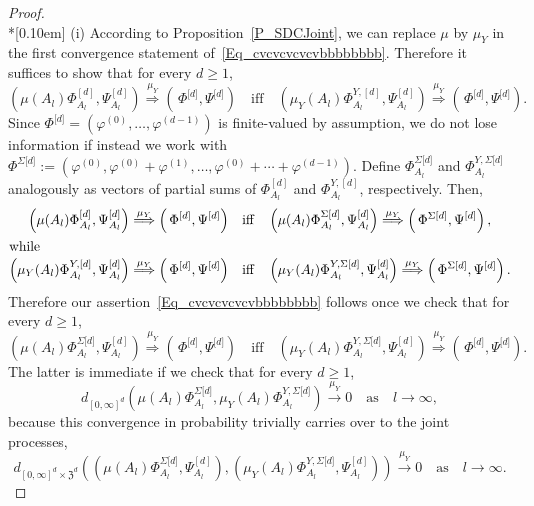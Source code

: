 \documentclass[10pt]{amsart}
\theoremstyle{definition}\newtheorem{defi}[theo]{Definition}\newtheorem{rema}[theo]{Remark}\newtheorem{exam}[theo]{Example}\newtheorem{exem}[theo]{Example}\newtheorem{nota}[theo]{Notation}
\newcommand{\frkZ}{\mathfrak{Z}}
\begin{document}
\begin{proof}\ \\*[0.10em]
\noindent(i) According to Proposition~\ref{P_SDCJoint}, we can replace $\mu$ by $\mu_{Y}$ in the first convergence statement of~\eqref{Eq_cvcvcvcvcvbbbbbbbb}. Therefore it suffices to show that for every $d\geq1$,
\[
\left(\mu(A_{l})\Phi_{A_{l}}^{[d]},\Psi_{A_{l}}^{[d]}\right)\overset{\mu_{Y} }{\Longrightarrow}\left(\,\Phi^{\lbrack d]},\Psi^{\lbrack d]}\right)\quad\text{iff}\quad \left(\mu_{Y}(A_{l})\Phi_{A_{l}}^{Y,[d]},\Psi_{A_{l}}^{[d]}\right)\overset{\mu_{Y} }{\Longrightarrow}\left(\,\Phi^{\lbrack d]},\Psi^{\lbrack d]}\right).
\]
Since $\Phi^{\lbrack d]}=(\varphi^{(0)},\ldots,\varphi^{(d-1)})$ is finite-valued by assumption, we do not lose information if instead we work with $\Phi^{\Sigma\lbrack d]}:=(\varphi^{(0)},\varphi^{(0)}+\varphi ^{(1)},\ldots,\varphi^{(0)}+\cdots+\varphi^{(d-1)})$. Define $\Phi_{A_{l} }^{\Sigma\lbrack d]}$ and $\Phi_{A_{l}}^{Y,\Sigma\lbrack d]}$ analogously as vectors of partial sums of $\Phi_{A_{l}}^{[d]}$ and $\Phi_{A_{l}}^{Y,[d]}$, respectively. Then,
\begin{align*}
\left(\mu(A_{l})\Phi_{A_{l}}^{[d]},\Psi_{A_{l}}^{[d]}\right)\overset{\mu_{Y} }{\Longrightarrow}\left(\,\Phi^{\lbrack d]},\Psi^{\lbrack d]}\right)\quad &\text{iff}\quad \left(\mu(A_{l})\Phi_{A_{l}}^{\Sigma\lbrack d]},\Psi_{A_{l}}^{[d]}\right)\overset {\mu_{Y}}{\Longrightarrow}\left(\,\Phi^{\Sigma\lbrack d]},\Psi^{\lbrack d]}\right),
\\
\intertext{while}
\left(\mu_{Y}(A_{l})\Phi_{A_{l}}^{Y,[d]},\Psi_{A_{l}}^{[d]}\right)\overset{\mu_{Y} }{\Longrightarrow}\left(\,\Phi^{\lbrack d]},\Psi^{\lbrack d]}\right)\quad &\text{iff}\quad\left(\mu_{Y}(A_{l})\Phi_{A_{l}}^{Y,\Sigma\lbrack d]},\Psi_{A_{l}}^{[d]}\right)\overset{\mu_{Y}}{\Longrightarrow}\left(\,\Phi^{\Sigma\lbrack d]},\Psi^{\lbrack d]}\right).
\end{align*}
Therefore our assertion~\eqref{Eq_cvcvcvcvcvbbbbbbbb} follows once we check that for every $d\geq1$,
\[
\left(\mu(A_{l})\Phi_{A_{l}}^{\Sigma\lbrack d]},\Psi_{A_{l}}^{[d]}\right)\overset{\mu _{Y}}{\Longrightarrow}\left(\,\Phi^{\lbrack d]},\Psi^{\lbrack d]}\right)\quad\text{iff}\quad \left(\mu_{Y}(A_{l})\Phi_{A_{l}}^{Y,\Sigma\lbrack d]},\Psi_{A_{l}}^{[d]}\right)\overset{\mu_{Y}}{\Longrightarrow}\left(\,\Phi^{\lbrack d]},\Psi^{\lbrack d]}\right).
\]
The latter is immediate if we check that for every $d\geq1$,
\begin{equation}\label{Eq_hshshashhshdshhadh}
d_{[0,\infty]^{d}}\left(\mu(A_{l})\Phi_{A_{l}}^{\Sigma\lbrack d]},\mu _{Y}(A_{l})\Phi_{A_{l}}^{Y,\Sigma\lbrack d]}\right) \overset{\mu_{Y} }{\longrightarrow}0 \quad \text{as} \quad l\rightarrow\infty,
\end{equation}
because this convergence in probability trivially carries over to the joint processes,
\[
d_{[0,\infty]^{d}\times\frkZ^{d}}\left(\left(\mu(A_{l})\Phi_{A_{l} }^{\Sigma\lbrack d]},\Psi_{A_{l}}^{[d]}\right),\left(\mu_{Y}(A_{l})\Phi_{A_{l}} ^{Y,\Sigma\lbrack d]},\Psi_{A_{l}}^{[d]}\right)\right) \overset{\mu_{Y} }{\longrightarrow}0\quad\text{as}\quad l\rightarrow\infty.
\]
\vspace{6pt}


\end{proof}
\end{document}

